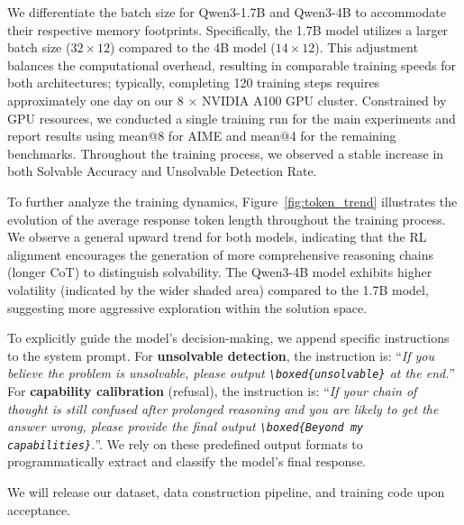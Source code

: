 We differentiate the batch size for Qwen3-1.7B and Qwen3-4B to accommodate their respective memory footprints. Specifically, the 1.7B model utilizes a larger batch size ($32 \times 12$) compared to the 4B model ($14 \times 12$). This adjustment balances the computational overhead, resulting in comparable training speeds for both architectures; typically, completing 120 training steps requires approximately one day on our 8 $\times$ NVIDIA A100 GPU cluster. Constrained by GPU resources, we conducted a single training run for the main experiments and report results using mean@8 for AIME and mean@4 for the remaining benchmarks.  Throughout the training process, we observed a stable increase in both Solvable Accuracy and Unsolvable Detection Rate.

To further analyze the training dynamics, Figure~\ref{fig:token_trend} illustrates the evolution of the average response token length throughout the training process. We observe a general upward trend for both models, indicating that the RL alignment encourages the generation of more comprehensive reasoning chains (longer CoT) to distinguish solvability. The Qwen3-4B model exhibits higher volatility (indicated by the wider shaded area) compared to the 1.7B model, suggesting more aggressive exploration within the solution space.

To explicitly guide the model's decision-making, we append specific instructions to the system prompt. 
For \textbf{unsolvable detection}, the instruction is: ``\textit{If you believe the problem is unsolvable, please output \texttt{\textbackslash boxed\{unsolvable\}} at the end.}'' 
For \textbf{capability calibration} (refusal), the instruction is: ``\textit{If your chain of thought is still confused after prolonged reasoning and you are likely to get the answer wrong, please provide the final output \texttt{\textbackslash boxed\{Beyond my capabilities\}}.}''. We rely on these predefined output formats to programmatically extract and classify the model's final response.

We will release our dataset, data construction pipeline, and training code upon acceptance.

